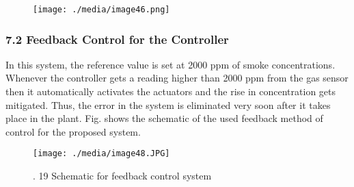 \begin{figure}[H]
	\begin{Center}
		\texttt{[image: ./media/image46.png]}
	\end{Center}
\end{figure}



\par

\par

\setlength{\parskip}{8.04pt}
\subsubsection*{7.2 Feedback Control for the Controller }
\begin{justify}
In this system, the reference value is set at 2000 ppm of smoke concentrations. Whenever the controller gets a reading higher than 2000 ppm from the gas sensor then it automatically activates the actuators and the rise in concentration gets mitigated. Thus, the error in the system is eliminated very soon after it takes place in the plant. Fig. shows the schematic of the used feedback method of control for the proposed system.
\end{justify}\par




\begin{figure}[H]
	\begin{Center}
		\texttt{[image: ./media/image48.JPG]}
		\caption{. 19 Schematic for feedback control system}
		\label{fig:_19_Schematic_for_feedback_control_system}
	\end{Center}
\end{figure}



\par

\par

